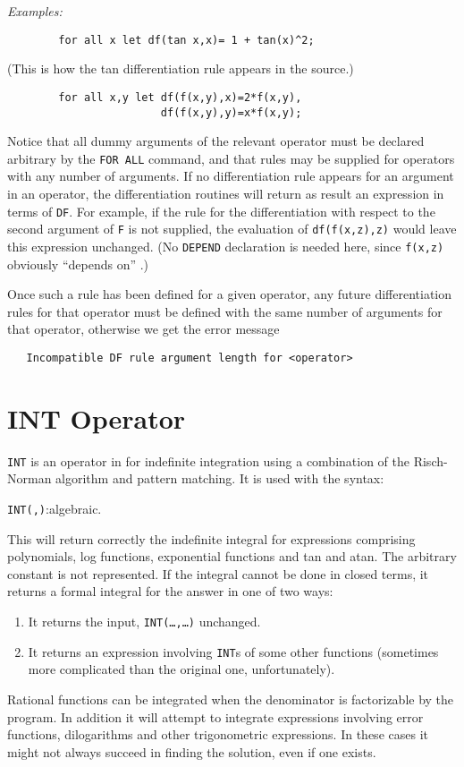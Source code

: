 \textit{Examples:}
\begin{verbatim}
        for all x let df(tan x,x)= 1 + tan(x)^2;
\end{verbatim}
(This is how the tan differentiation rule appears in the {\REDUCE}
source.)
\begin{verbatim}
        for all x,y let df(f(x,y),x)=2*f(x,y),
                        df(f(x,y),y)=x*f(x,y);
\end{verbatim}
Notice that all dummy arguments of the relevant operator must be declared
arbitrary by the \texttt{FOR ALL} command, and that rules may be supplied for
operators with any number of arguments.  If no differentiation rule
appears for an argument in an operator, the differentiation routines will
return as result an expression in terms of \texttt{DF}.  For
example, if the rule for the differentiation with respect to the second
argument of \texttt{F} is not supplied, the evaluation of \texttt{df(f(x,z),z)}
would leave this expression unchanged. (No \texttt{DEPEND} declaration
is needed here, since \texttt{f(x,z)} obviously ``depends on'' .)

Once such a rule has been defined for a given operator, any future
differentiation rules for that operator must be
defined with the same number of arguments for that operator, otherwise we
get the error message
\begin{verbatim}
   Incompatible DF rule argument length for <operator>
\end{verbatim}

\section{INT Operator}
\hypertarget{operator:INT}{}
\texttt{INT} is an operator in {\REDUCE} for indefinite
integration using a
combination of the Risch-Norman algorithm and pattern matching.  It is
used with the syntax:
\begin{syntax}
   \texttt{INT(}\texttt{,}\texttt{)}:algebraic.
\end{syntax}
This will return correctly the indefinite integral for expressions comprising
polynomials, log functions, exponential functions and tan and atan. The
arbitrary constant is not represented. If the integral cannot be done in
closed terms, it returns a formal integral for the answer in one of two ways:
\begin{enumerate}
\item It returns the input, \texttt{INT(\ldots,\ldots)} unchanged.

\item It returns an expression involving \texttt{INT}s of some
      other functions (sometimes more complicated than
      the original one, unfortunately).
\end{enumerate}
Rational functions can be integrated when the denominator is factorizable
by the program. In addition it will attempt to integrate expressions
involving error functions, dilogarithms and other trigonometric
expressions. In these cases it might not always succeed in finding the
solution, even if one exists.

